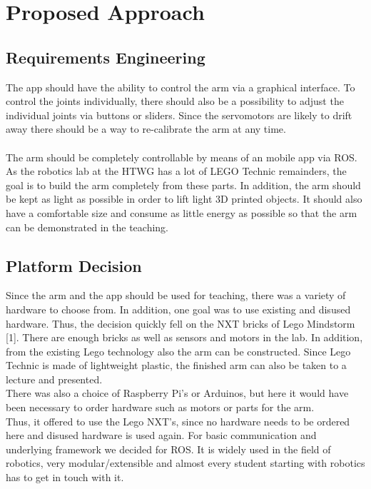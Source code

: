 \documentclass[conference]{IEEEtran}
\begin{document}
\section{Proposed Approach}\label{sec:approach}

\subsection{Requirements Engineering}\label{sec:requirements}
The app should have the ability to control the arm via a graphical interface. To control the joints individually, there should also be a possibility to adjust the individual joints via buttons or sliders. Since the servomotors are likely to drift away there should be a way to re-calibrate the arm at any time.
\\\\
The arm should be completely controllable by means of an mobile app via ROS. As the robotics lab at the HTWG has a lot of LEGO Technic remainders, the goal is to build the arm completely from these parts. In addition, the arm should be kept as light as possible in order to lift light 3D printed objects. It should also have a comfortable size and consume as little energy as possible so that the arm can be demonstrated in the teaching. 

\subsection{Platform Decision}\label{sec:platform}
Since the arm and the app should be used for teaching, there was a variety of hardware to choose from. In addition, one goal was to use existing and disused hardware. Thus, the decision quickly fell on the NXT bricks of Lego Mindstorm [1]. There are enough bricks as well as sensors and motors in the lab. In addition, from the existing Lego technology also the arm can be constructed. Since Lego Technic is made of lightweight plastic, the finished arm can also be taken to a lecture and presented.\\
There was also a choice of Raspberry Pi's or Arduinos, but here it would have been necessary to order hardware such as motors or parts for the arm.\\
Thus, it offered to use the Lego NXT's, since no hardware needs to be ordered here and disused hardware is used again. For basic communication and underlying framework we decided for ROS. It is widely used in the field of robotics, very modular/extensible and almost every student starting with robotics has to get in touch with it.
\end{document}

